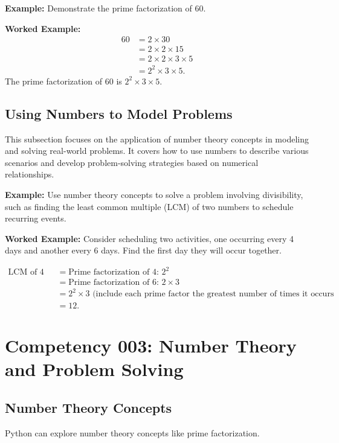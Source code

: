 \documentclass{book}
\begin{document}
\textbf{Example:} Demonstrate the prime factorization of 60.


\textbf{Worked Example:}
\begin{align*}
        60 &= 2 \times 30 \\
           &= 2 \times 2 \times 15 \\
           &= 2 \times 2 \times 3 \times 5 \\
           &= 2^2 \times 3 \times 5.
\end{align*}
The prime factorization of 60 is \(2^2 \times 3 \times 5\).


\subsection{Using Numbers to Model Problems}
This subsection focuses on the application of number theory concepts in modeling and solving real-world problems. It covers how to use numbers to describe various scenarios and develop problem-solving strategies based on numerical relationships.


\textbf{Example:} Use number theory concepts to solve a problem involving divisibility, such as finding the least common multiple (LCM) of two numbers to schedule recurring events.


\textbf{Worked Example:}
Consider scheduling two activities, one occurring every 4 days and another every 6 days. Find the first day they will occur together.


\begin{align*}
        \text{LCM of 4 and 6} &= \text{Prime factorization of 4: } 2^2 \\
                             &= \text{Prime factorization of 6: } 2 \times 3 \\
                             &= 2^2 \times 3 \text{ (include each prime factor the greatest number of times it occurs in any one factorization)} \\
                             &= 12.
\end{align*}


\section{Competency 003: Number Theory and Problem Solving}
\subsection{Number Theory Concepts}
Python can explore number theory concepts like prime factorization.
\end{document}
